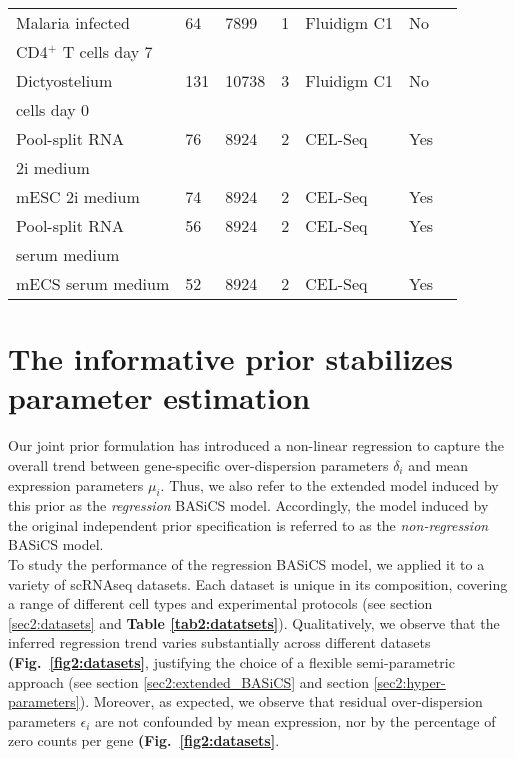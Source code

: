 \begin{table}[hb	]
\begin{tabular}{lllllll}
Malaria infected  & 64       & 7899     & 1          & Fluidigm C1       & No   & \citep{Lonnberg2017}         \\
CD4$^+$  T cells day 7    &   & &  &  &  &   \\
\midrule

Dictyostelium             & 131      & 10738    & 3          & Fluidigm C1       & No   & \citep{Antolovic2017}        \\
cells day 0  &  &   &   &  & & \\
\midrule

Pool-split RNA                 & 76       & 8924     & 2          & CEL-Seq           & Yes  & \citep{Grun2014}            \\
2i medium  &  &  & &  &  & \\
\midrule

mESC 2i medium    & 74       & 8924     & 2          & CEL-Seq           & Yes  & \citep{Grun2014} \\
\midrule

Pool-split RNA             & 56       & 8924     & 2          & CEL-Seq           & Yes  & \citep{Grun2014}            \\
serum medium &  &      &         &   &   &  \\
\midrule

mECS serum medium & 52       & 8924     & 2          & CEL-Seq           & Yes  & \citep{Grun2014} \\
\bottomrule       
\end{tabular}
\end{table}


\section{The informative prior stabilizes parameter estimation}

Our joint prior formulation has introduced a non-linear regression to capture the overall trend between gene-specific over-dispersion parameters $\delta_i$ and mean expression parameters $\mu_i$. Thus, we also refer to the extended model induced by this prior as the \textit{regression} BASiCS model. Accordingly, the model induced by the original independent prior specification \citep{Vallejos2016} is referred to as the \textit{non-regression} BASiCS model.\\ 

To study the performance of the regression BASiCS model, we applied it to a variety of scRNAseq datasets. Each dataset is unique in its composition, covering a range of different cell types and experimental protocols (see section \ref{sec2:datasets} and \textbf{Table \ref{tab2:datatsets}}). Qualitatively, we observe that the inferred regression trend varies substantially across different datasets \textbf{(Fig.~\ref{fig2:datasets}}, justifying the choice of a flexible semi-parametric approach (see section \ref{sec2:extended_BASiCS} and section \ref{sec2:hyper-parameters}). Moreover, as expected, we observe that residual over-dispersion parameters $\epsilon_i$ are not confounded by mean expression, nor by the percentage of zero counts per gene \textbf{(Fig.~\ref{fig2:datasets}}. \\

